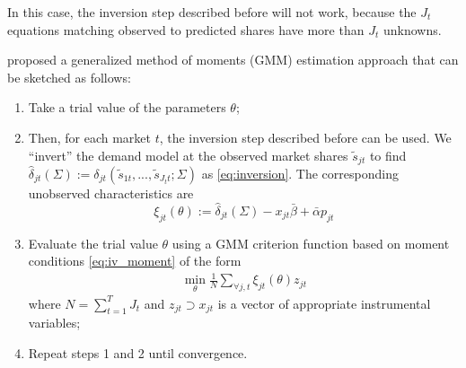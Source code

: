 \documentclass[11pt]{elegantbook}
\begin{document}
In this case, the inversion step described before will not work, because the $J_t$ equations matching observed to predicted shares have more than $J_t$ unknowns.

\cite{berry1995automobile} proposed a generalized method of moments (GMM) estimation approach that can be sketched as follows:
\begin{enumerate}
    \item Take a trial value of the parameters $\theta$;
    \item Then, for each market $t$, the inversion step described before can be used. We ``invert'' the demand model at the observed market shares $\tilde{s}_{jt}$ to find $\hat{\delta}_{jt}(\Sigma):=\delta_{jt}(\tilde{s}_{1t},...,\tilde{s}_{J_tt};\Sigma)$ as \eqref{eq:inversion}. The corresponding unobserved characteristics are $$\xi_{jt}(\theta):=\hat{\delta}_{jt}(\Sigma)-x_{jt}\bar{\beta}+\bar{\alpha}p_{jt}$$
    \item Evaluate the trial value $\theta$ using a GMM criterion function based on moment conditions \eqref{eq:iv_moment} of the form
    \begin{equation}
        \begin{aligned}
            \min_{\theta}\frac{1}{N}\sum_{\forall j,t}\xi_{jt}(\theta)z_{jt}
        \end{aligned}
        \nonumber
    \end{equation}
    where $N=\sum_{t=1}^T J_t$ and $z_{jt}\supset x_{jt}$ is a vector of  appropriate instrumental variables;
    \item Repeat steps 1 and 2 until convergence.
\end{enumerate}
\end{document}
